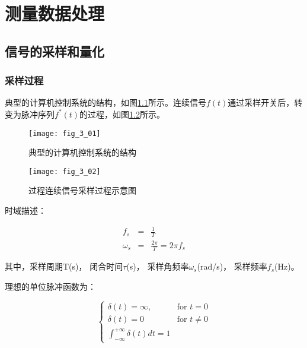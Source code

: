 \setcounter{chapter}{2}

\chapter{测量数据处理}

\section{信号的采样和量化}

\subsection{采样过程}

典型的计算机控制系统的结构，如图\ref{fig_3_01}所示。连续信号$f(t)$通过采样开关后，转变为脉冲序列$f^*(t)$的过程，如图\ref{fig_3_02}所示。


\begin{figure}[h]
  \centering
  \texttt{[image: fig\_3\_01]}\\
  \caption{典型的计算机控制系统的结构}\label{fig_3_01}
\end{figure}


\begin{figure}[h]
  \centering
  \texttt{[image: fig\_3\_02]}\\
  \caption{过程连续信号采样过程示意图}\label{fig_3_02}
\end{figure}

时域描述：

\begin{eqnarray}
  f_s &=& \frac{1}{T} \\
  \omega_s &=& \frac{2\pi}{T}=2\pi f_s
\end{eqnarray}

其中，采样周期T(s)，
闭合时间$\tau$(s)，
采样角频率$\omega_s$(rad/s)，
采样频率$f_s$(Hz)。



理想的单位脉冲函数为：

\begin{displaymath}
\left\{ \begin{array}{ll}
\delta(t)=\infty, & \textrm{for $t=0$}\\
\delta(t)=0 & \textrm{for $t\neq 0$}\\
\int_{-\infty}^{+\infty} \delta(t)dt=1 &
\end{array} \right.
\end{displaymath}


